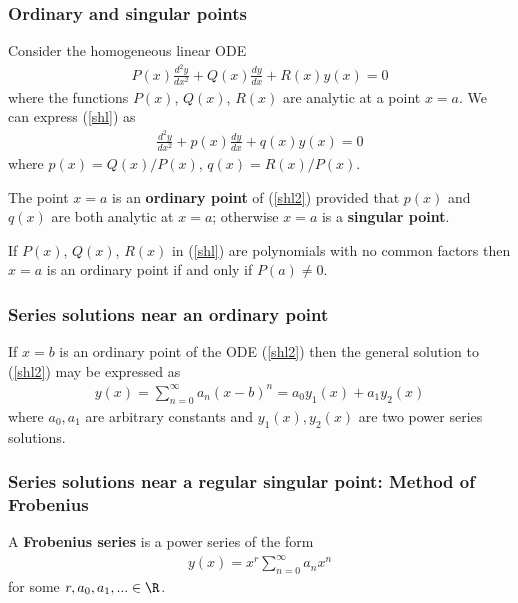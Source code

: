 \documentclass{article}
\begin{document}
\subsubsection{Ordinary and singular points}

Consider the homogeneous linear ODE
\begin{align}
	\label{shl}
	P(x)\frac{d^2y}{dx^2}+Q(x)\frac{dy}{dx}+R(x)y(x)=0
\end{align}
where the functions $P(x)$, $Q(x)$, $R(x)$ are analytic at a point $x=a$.
We can express (\ref{shl}) as
\begin{align}
	\label{shl2}
	\frac{d^2y}{dx^2}+p(x)\frac{dy}{dx}+q(x)y(x)=0
\end{align}
where $p(x)=Q(x)/P(x)$, $q(x)=R(x)/P(x)$.
\begin{definition}
	The point $x=a$ is an \textbf{ordinary point} of (\ref{shl2}) provided that
	$p(x)$ and $q(x)$ are both analytic at $x=a$; otherwise $x=a$ is a
	\textbf{singular point}.
\end{definition}
\begin{lemma}
	If $P(x)$, $Q(x)$, $R(x)$ in (\ref{shl}) are polynomials with no common
	factors then $x=a$ is an ordinary point if and only if $P(a)\not=0$.
\end{lemma}

\subsubsection{Series solutions near an ordinary point}

\begin{theorem}
	If $x=b$ is an ordinary point of the ODE (\ref{shl2}) then the general
	solution to (\ref{shl2}) may be expressed as
	\begin{align*}
		y(x) = \sum_{n=0}^\infty a_n(x-b)^n = a_0y_1(x)+a_1y_2(x)
	\end{align*}
	where $a_0,a_1$ are arbitrary constants and $y_1(x),y_2(x)$ are two
	power series solutions.
\end{theorem}

\subsubsection{Series solutions near a regular singular point: Method of Frobenius}

\begin{definition}
	A \textbf{Frobenius series} is a power series of the form
	\begin{align}
		\label{frob}
		y(x)=x^r\sum_{n=0}^\infty a_nx^n
	\end{align}
	for some $r,a_0,a_1,...\in\R$.
\end{definition}
\end{document}
